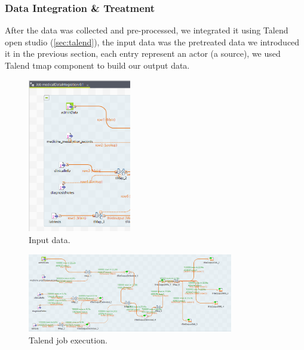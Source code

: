 \newpage

\subsubsection*{Data Integration \& Treatment}


After the data was collected and pre-processed, we integrated it using Talend open studio (\ref{sec:talend}), the input data was the pretreated data we introduced it in the previous section, each entry represent an actor (a source), we used Talend tmap component to build our output data.

\begin{figure}[h!]
  \center
  \includegraphics[width=0.40\textwidth]{images/chapter3/jobInputs.PNG}
  \caption{Input data.}
  \label{fig:jobinputes}
\end{figure}
\begin{figure}[h!]
  \center
  \includegraphics[width=0.80\textwidth]{images/chapter3/jobresult.PNG}
  \caption{Talend job execution.}
  \label{fig:jobtalend}
\end{figure}
\newpage
